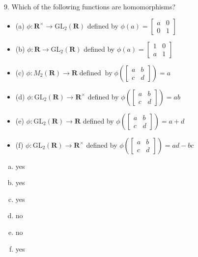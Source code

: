 \begin{mdframed}[style=darkQuesion]
  9. Which of the following functions are homomorphisms?
\begin{itemize}
\item[]{(a) $\phi: \mathbf{R}^{\times} \rightarrow \mathrm{GL}_{2}(\mathbf{R})$ defined by $\phi(a)=\left[\begin{array}{ll}a & 0 \\ 0 & 1\end{array}\right]$}
\item[]{(b) $\phi: \mathbf{R} \rightarrow \mathrm{GL}_{2}(\mathbf{R})$ defined by $\phi(a)=\left[\begin{array}{ll}1 & 0 \\ a & 1\end{array}\right]$}
\item[]{(c) $\phi: M_{2}(\mathbf{R}) \rightarrow \mathbf{R} \operatorname{defined} \operatorname{by} \phi\left(\left[\begin{array}{ll}a & b \\ c & d\end{array}\right]\right)=a$}
\item[]{(d) $\phi: \mathrm{GL}_{2}(\mathbf{R}) \rightarrow \mathbf{R}^{\times}$ defined by $\phi\left(\left[\begin{array}{ll}a & b \\ c & d\end{array}\right]\right)=a b$}
\item[]{(e) $\phi: \mathrm{GL}_{2}(\mathbf{R}) \rightarrow \mathbf{R}$ defined by $\phi\left(\left[\begin{array}{ll}a & b \\ c & d\end{array}\right]\right)=a+d$}
\item[]{(f) $\phi: \mathrm{GL}_{2}(\mathbf{R}) \rightarrow \mathbf{R}^{\times}$ defined by $\phi\left(\left[\begin{array}{ll}a & b \\ c & d\end{array}\right]\right)=a d-b c$}
\end{itemize}
\end{mdframed}
\begin{mdframed}[style=darkAnswer,frametitle={Joe Starr}]
  \begin{enumerate}[(a)]
  \item{yes}
  \item{yes}
  \item{yes}
  \item{no}
  \item{no}
  \item{yes}
  \end{enumerate}

\end{mdframed}
